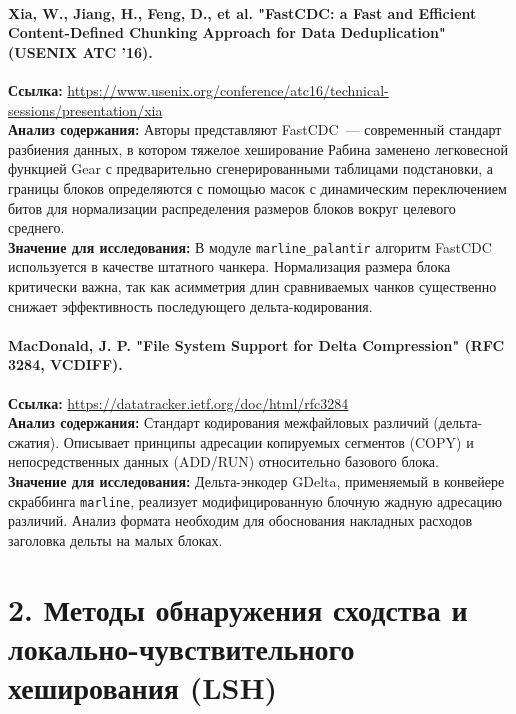 \documentclass[a4paper,14pt]{extarticle}
\begin{document}
\paragraph{Xia, W., Jiang, H., Feng, D., et al. "FastCDC: a Fast and Efficient Content-Defined Chunking Approach for Data Deduplication" (USENIX ATC '16).}
\textbf{Ссылка:} \url{https://www.usenix.org/conference/atc16/technical-sessions/presentation/xia} \\
\textbf{Анализ содержания:} Авторы представляют FastCDC~--- современный стандарт разбиения данных, в котором тяжелое хеширование Рабина заменено легковесной функцией Gear с предварительно сгенерированными таблицами подстановки, а границы блоков определяются с помощью масок с динамическим переключением битов для нормализации распределения размеров блоков вокруг целевого среднего. \\
\textbf{Значение для исследования:} В модуле \texttt{marline\_palantir} алгоритм FastCDC используется в качестве штатного чанкера. Нормализация размера блока критически важна, так как асимметрия длин сравниваемых чанков существенно снижает эффективность последующего дельта-кодирования.

\paragraph{MacDonald, J. P. "File System Support for Delta Compression" (RFC 3284, VCDIFF).}
\textbf{Ссылка:} \url{https://datatracker.ietf.org/doc/html/rfc3284} \\
\textbf{Анализ содержания:} Стандарт кодирования межфайловых различий (дельта-сжатия). Описывает принципы адресации копируемых сегментов (COPY) и непосредственных данных (ADD/RUN) относительно базового блока. \\
\textbf{Значение для исследования:} Дельта-энкодер GDelta, применяемый в конвейере скраббинга \texttt{marline}, реализует модифицированную блочную жадную адресацию различий. Анализ формата необходим для обоснования накладных расходов заголовка дельты на малых блоках.

\section*{2. Методы обнаружения сходства и локально-чувствительного хеширования (LSH)}
\end{document}

